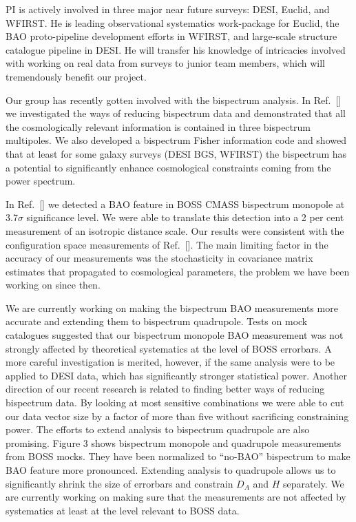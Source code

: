 PI is actively involved in three major near future surveys: DESI, Euclid, and
WFIRST. He is leading observational systematics work-package for Euclid, the
BAO proto-pipeline development efforts in WFIRST, and large-scale structure
catalogue pipeline in DESI. He will transfer his knowledge of intricacies
involved with working on real data from surveys to junior team members, which
will tremendously benefit our project.

Our group has recently gotten involved with the bispectrum analysis. In Ref.~[]
we investigated the ways of reducing bispectrum data and demonstrated that all
the cosmologically relevant information is contained in three bispectrum
multipoles. We also developed a bispectrum Fisher information code and showed
that at least for some galaxy surveys (DESI BGS, WFIRST) the bispectrum has a
potential to significantly enhance cosmological constraints coming from the
power spectrum.

In Ref.~[] we detected a BAO feature in BOSS CMASS bispectrum monopole at
3.7$\sigma$ significance level. We were able to translate this detection into a
2 per cent measurement of an isotropic distance scale. Our results were
consistent with the configuration space measurements of Ref.~[]. The main
limiting factor in the accuracy of our measurements was the stochasticity in
covariance matrix estimates that propagated to cosmological parameters, the
problem we have been working on since then.

We are currently working on making the bispectrum BAO measurements more
accurate and extending them to bispectrum quadrupole. Tests on mock
catalogues suggested that our bispectrum monopole BAO measurement was not
strongly affected by theoretical systematics at the level of BOSS errorbars. A
more careful investigation is merited, however, if the same analysis were to be
applied to DESI data, which has significantly stronger statistical power.
Another direction of our recent research is related to finding better ways of
reducing bispectrum data. By looking at most sensitive combinations we were
able to cut our data vector size by a factor of more than five without
sacrificing constraining power. The efforts to extend analysis to bispectrum
quadrupole are also promising. Figure 3 shows bispectrum monopole and
quadrupole measurements from BOSS mocks. They have been normalized to
``no-BAO'' bispectrum to make BAO feature more pronounced. Extending analysis
to quadrupole allows us to significantly shrink the size of errorbars and
constrain $D_A$ and $H$ separately. We are currently working on making sure
that the measurements are not affected by systematics at least at the level
relevant to BOSS data.


